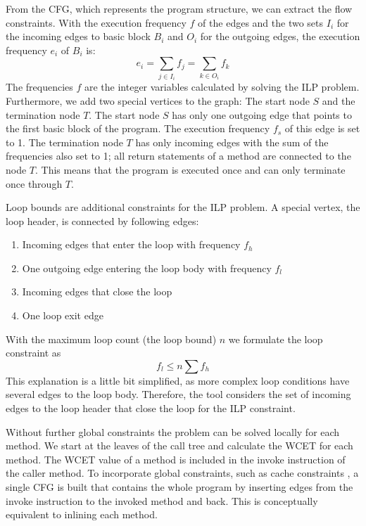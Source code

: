 From the CFG, which represents the program structure, we can extract
the flow constraints. With the execution frequency $f$ of the edges
and the two sets $I_i$ for the incoming edges to basic block $B_i$
and $O_i$ for the outgoing edges, the execution frequency $e_i$ of
$B_i$ is:
\begin{equation*}
    e_i = \sum_{j\in I_i} f_j = \sum_{k\in O_i} f_k
\end{equation*}
The frequencies $f$ are the integer variables calculated by solving
the ILP problem. Furthermore, we add two special vertices to the
graph: The start node $S$ and the termination node $T$. The start
node $S$ has only one outgoing edge that points to the first basic
block of the program. The execution frequency $f_s$ of this edge is
set to 1. The termination node $T$ has only incoming edges with the
sum of the frequencies also set to 1; all return statements of a
method are connected to the node $T$. This means that the program is
executed once and can only terminate once through $T$.

Loop bounds are additional constraints for the ILP problem. A special
vertex, the loop header, is connected by following edges:
\begin{enumerate}
    \item Incoming edges that enter the loop with frequency $f_h$
    \item One outgoing edge entering the loop body with frequency
        $f_l$
    \item Incoming edges that close the loop
    \item One loop exit edge
\end{enumerate}
With the maximum loop count (the loop bound) $n$ we formulate the
loop constraint as
\begin{equation*}
    f_l \le n \sum f_h
\end{equation*}
This explanation is a little bit simplified, as more complex loop
conditions have several edges to the loop body. Therefore, the tool
considers the set of incoming edges to the loop header that close the
loop for the ILP constraint.

Without further global constraints the problem can be solved locally
for each method. We start at the leaves of the call tree and
calculate the WCET for each method. The WCET value of a method is
included in the invoke instruction of the caller method. To
incorporate global constraints, such as cache constraints
\cite{828940}, a single CFG is built that contains the whole program
by inserting edges from the invoke instruction to the invoked method
and back. This is conceptually equivalent to inlining each method.

